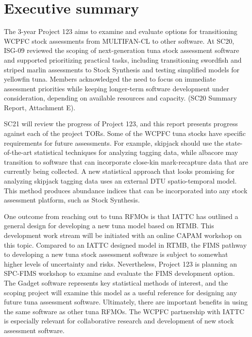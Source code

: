 \documentclass{SCreport}
\begin{document}
\wcpfctitlepage

\tableofcontents
\newpage

\section{Executive summary}

\vspace{-1ex}

The 3-year Project 123 aims to examine and evaluate options for transitioning
WCPFC stock assessments from MULTIFAN-CL to other software. At SC20, ISG-09
reviewed the scoping of next-generation tuna stock assessment software and
supported prioritizing practical tasks, including transitioning swordfish and
striped marlin assessments to Stock Synthesis and testing simplified models for
yellowfin tuna. Members acknowledged the need to focus on immediate assessment
priorities while keeping longer-term software development under consideration,
depending on available resources and capacity. (SC20 Summary Report, Attachment
E).

SC21 will review the progress of Project 123, and this report presents progress
against each of the project TORs. Some of the WCPFC tuna stocks have specific
requirements for future assessments. For example, skipjack should use the
state-of-the-art statistical techniques for analyzing tagging data, while
albacore may transition to software that can incorporate close-kin
mark-recapture data that are currently being collected. A new statistical
approach that looks promising for analyzing skipjack tagging data uses an
external DTU spatio-temporal model. This method produces abundance indices that
can be incorporated into any stock assessment platform, such as Stock Synthesis.

One outcome from reaching out to tuna RFMOs is that IATTC has outlined a general
design for developing a new tuna model based on RTMB. This development work
stream will be initiated with an online CAPAM workshop on this topic. Compared
to an IATTC designed model in RTMB, the FIMS pathway to developing a new tuna
stock assessment software is subject to somewhat higher levels of uncertainty
and risks. Nevertheless, Project 123 is planning an SPC-FIMS workshop to examine
and evaluate the FIMS development option. The Gadget software represents key
statistical methods of interest, and the scoping project will examine this model
as a useful reference for designing any future tuna assessment software.
Ultimately, there are important benefits in using the same software as other
tuna RFMOs. The WCPFC partnership with IATTC is especially relevant for
collaborative research and development of new stock assessment software.
\end{document}
